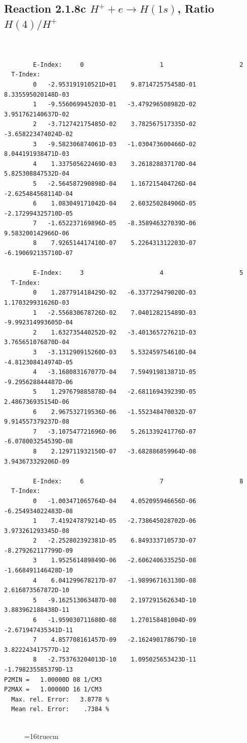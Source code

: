 \documentclass[12pt,dvipdfmx]{article}
\begin{document}
\subsection{
Reaction 2.1.8c  $H^+ + e \rightarrow H(1s) $,  Ratio $H(4)/H^+$
}

\begin{small}\begin{verbatim}


        E-Index:     0                     1                     2
  T-Index:
        0   -2.953191910521D+01    9.871472575458D-01    8.335595020148D-03
        1   -9.556069945203D-01   -3.479296508982D-02    3.951762140637D-02
        2   -3.712742175485D-02    3.782567517335D-02   -3.658223474024D-02
        3   -9.582306874061D-03   -1.030473600466D-02    8.044191938471D-03
        4    1.337505622469D-03    3.261828837170D-04    5.825308847532D-04
        5   -2.564587290898D-04    1.167215404726D-04   -2.625484568114D-04
        6    1.083049171042D-04    2.603250284906D-05   -2.172994325710D-05
        7   -1.652237169896D-05   -8.358946327039D-06    9.583200142966D-06
        8    7.926514417410D-07    5.226431312203D-07   -6.190692135710D-07

        E-Index:     3                     4                     5
  T-Index:
        0    1.287791418429D-02   -6.337729479020D-03    1.170329931626D-03
        1   -2.556830678726D-02    7.040128215489D-03   -9.992314993605D-04
        2    1.632735440252D-02   -3.401365727621D-03    3.765651076870D-04
        3   -3.131290915260D-03    5.532459754610D-04   -4.812308414974D-05
        4   -3.168083167077D-04    7.594919813871D-05   -9.295628844487D-06
        5    1.297679885878D-04   -2.681169439239D-05    2.486736935154D-06
        6    2.967532719536D-06   -1.552348470032D-07    9.914557379237D-08
        7   -3.107547721696D-06    5.261339241776D-07   -6.078003254539D-08
        8    2.129711932150D-07   -3.682886859964D-08    3.943673329206D-09

        E-Index:     6                     7                     8
  T-Index:
        0   -1.003471065764D-04    4.052095946656D-06   -6.254934022483D-08
        1    7.419247879214D-05   -2.738645028702D-06    3.973261293345D-08
        2   -2.252802392381D-05    6.849333710573D-07   -8.279262117799D-09
        3    1.952561489849D-06   -2.606240633525D-08   -1.668491146428D-10
        4    6.041299678217D-07   -1.989967163130D-08    2.616873567872D-10
        5   -9.162513063487D-08    2.197291562634D-10    3.883962188438D-11
        6   -1.959030711680D-08    1.270158481004D-09   -2.671947435341D-11
        7    4.857708161457D-09   -2.162490178679D-10    3.822243417577D-12
        8   -2.753763204013D-10    1.095025653423D-11   -1.798235585379D-13
P2MIN =   1.00000D 08 1/CM3
P2MAX =   1.00000D 16 1/CM3
  Max. rel. Error:   3.8778 %
  Mean rel. Error:    .7384 %


\end{verbatim}\end{small}
\begin{figure} \label{2.1.8rc}
\epsfxsize=16truecm
\end{figure}
\newpage
\end{document}
